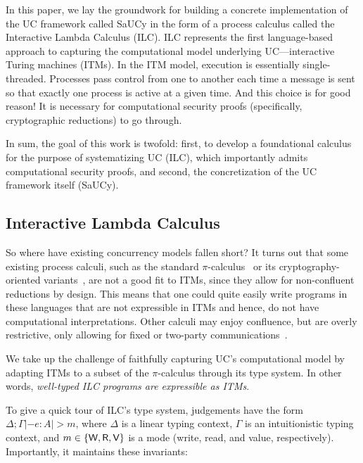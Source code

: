 In this paper, we lay the groundwork for building a concrete implementation of
the UC framework called SaUCy in the form of a process calculus called the
Interactive Lambda Calculus (ILC). ILC represents the first language-based
approach to capturing the computational model underlying UC---interactive Turing
machines (ITMs). In the ITM model, execution is essentially
single-threaded. Processes pass control from one to another each time a message
is sent so that exactly one process is active at a given time. And this choice
is for good reason! It is necessary for computational security proofs
(specifically, cryptographic reductions) to go through.

In sum, the goal of this work is twofold: first, to develop a foundational
calculus for the purpose of systematizing UC (ILC), which importantly admits
computational security proofs, and second, the concretization of the UC
framework itself (SaUCy).

\subsection{Interactive Lambda Calculus}

So where have existing concurrency models fallen short?  It turns out that some
existing process calculi, such as the standard
$\pi$-calculus~\cite{milner1999communicating} or its cryptography-oriented
variants~\cite{abadi1999calculus, abadi2001mobile}, are not a good fit to ITMs,
since they allow for non-confluent reductions by design. This means that one
could quite easily write programs in these languages that are not expressible in
ITMs and hence, do not have computational interpretations. Other calculi may
enjoy confluence, but are overly restrictive, only allowing for fixed or
two-party
communications~\cite{kobayashi1999linearity,bohl2016symbolic,fowler2018session}.

We take up the challenge of faithfully capturing UC's computational model by
adapting ITMs to a subset of the $\pi$-calculus through its type system. In other
words, \emph{well-typed ILC programs are expressible as ITMs}.

To give a quick tour of ILC's type system, judgements have the form $\Delta ; \Gamma |- e
: A |> m$, where $\Delta$ is a linear typing context, $\Gamma$ is an intuitionistic typing
context, and $m \in \{\textsf{W}, \textsf{R}, \textsf{V}\}$ is a mode (write, read, and value,
respectively). Importantly, it maintains these invariants:

